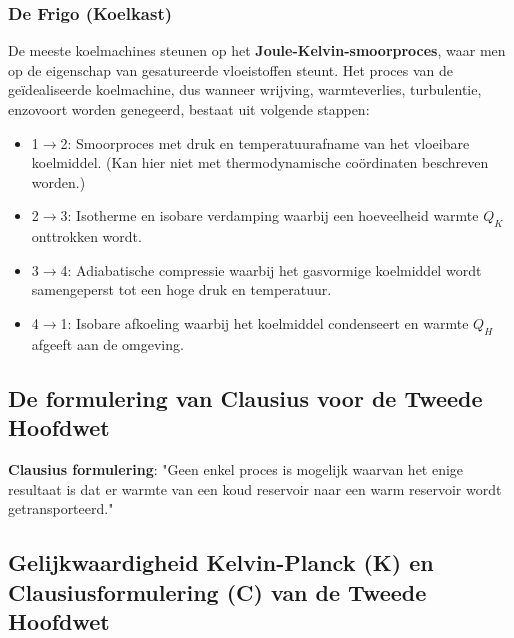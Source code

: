 \subsubsection{De Frigo (Koelkast)}
De meeste koelmachines steunen op het \textbf{Joule-Kelvin-smoorproces}, waar men op de eigenschap van gesatureerde vloeistoffen steunt.
Het proces van de geïdealiseerde koelmachine, dus wanneer wrijving, warmteverlies, turbulentie, enzovoort worden genegeerd, bestaat uit volgende stappen:
\begin{itemize}
    \item 1\(\to\)2: Smoorproces met druk en temperatuurafname van het vloeibare koelmiddel. (Kan hier niet met thermodynamische coördinaten beschreven worden.) 
    \item 2\(\to\)3: Isotherme en isobare verdamping waarbij een hoeveelheid warmte \(Q_K\) onttrokken wordt.
    \item 3\(\to\)4: Adiabatische compressie waarbij het gasvormige koelmiddel wordt samengeperst tot een hoge druk en temperatuur.
    \item 4\(\to\)1: Isobare afkoeling waarbij het koelmiddel condenseert en warmte \(Q_H\) afgeeft aan de omgeving.
\end{itemize}

\subsection{De formulering van  Clausius voor de Tweede Hoofdwet}

\begin{postulate}
    \textbf{Clausius formulering}: "Geen enkel proces is mogelijk waarvan het enige resultaat is dat er warmte van een koud reservoir naar een warm reservoir wordt getransporteerd."
\end{postulate} 

\subsection{Gelijkwaardigheid Kelvin-Planck (K) en Clausiusformulering (C) van de Tweede Hoofdwet}

